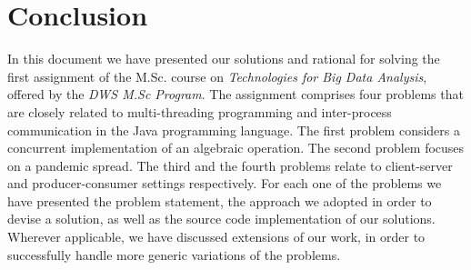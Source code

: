 \documentclass[acmlarge]{acmart}
\begin{document}
\section{Conclusion}
\label{sec:conclusion}
In this document we have presented our solutions and rational for solving the first assignment of the M.Sc. course on \emph{Technologies for Big Data Analysis}, offered by the \emph{DWS M.Sc Program}. The assignment comprises four problems that are closely related to multi-threading programming and inter-process communication in the Java programming language. The first problem considers a concurrent implementation of an algebraic operation. The second problem focuses on a pandemic spread. The third and the fourth problems relate to client-server and producer-consumer settings respectively. For each one of the problems we have presented the problem statement, the approach we adopted in order to devise a solution, as well as the source code implementation of our solutions. Wherever applicable, we have discussed extensions of our work, in order to successfully handle more generic variations of the problems.
\end{document}
